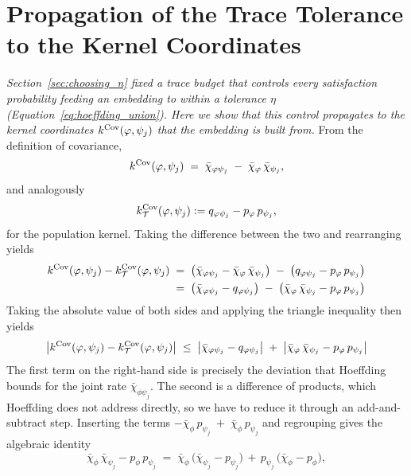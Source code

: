 \documentclass[titlepage,a4paper,11pt]{report}
\begin{document}
\section{Propagation of the Trace Tolerance to the Kernel Coordinates}\label{app:tolerance_derivation}
    \emph{Section~\ref{sec:choosing_n} fixed a trace budget that controls every satisfaction probability feeding an embedding to within a tolerance $\eta$ (Equation~\eqref{eq:hoeffding_union}). Here we show that this control propagates to the kernel coordinates $k^{\mathrm{Cov}}(\varphi,\psi_j)$ that the embedding is built from.} From the definition of covariance,
    \begin{equation}\label{eq:kcov_decomposition}
        k^{\mathrm{Cov}}(\varphi, \psi_j) \;=\;\bar\chi_{\varphi\psi_j} \;-\; \bar\chi_\varphi\, \bar\chi_{\psi_j},
    \end{equation}
    and analogously 
    \begin{equation}
        k^{\mathrm{Cov}}_\mathcal{T}(\varphi, \psi_j) := q_{\varphi\psi_j} - p_\varphi\, p_{\psi_j},
    \end{equation} for the population kernel. Taking the difference between the two and rearranging yields
    \begin{align*}
        k^{\mathrm{Cov}}(\varphi, \psi_j) - k^{\mathrm{Cov}}_\mathcal{T}(\varphi, \psi_j)
        &\;=\; \bigl(\bar\chi_{\varphi\psi_j} - \bar\chi_\varphi\, \bar\chi_{\psi_j}\bigr) \;-\; \bigl(q_{\varphi\psi_j} - p_\varphi\, p_{\psi_j}\bigr) \\
        &\;=\; \bigl(\bar\chi_{\varphi\psi_j} - q_{\varphi\psi_j}\bigr) \;-\; \bigl(\bar\chi_\varphi\, \bar\chi_{\psi_j} - p_\varphi\, p_{\psi_j}\bigr)
    \end{align*}
    Taking the absolute value of both sides and applying the triangle inequality then yields
    \begin{equation}\label{eq:kcov_outer_triangle}
        \bigl|k^{\mathrm{Cov}}(\varphi, \psi_j) - k^{\mathrm{Cov}}_\mathcal{T}(\varphi, \psi_j)\bigr| \;\le\; \bigl|\bar\chi_{\varphi\psi_j} - q_{\varphi\psi_j}\bigr| \;+\; \bigl|\bar\chi_\varphi\, \bar\chi_{\psi_j} - p_\varphi\, p_{\psi_j}\bigr|
    \end{equation}
    The first term on the right-hand side is precisely the deviation that Hoeffding bounds for the joint rate $\bar\chi_{\phi\psi_j}$. The second is a difference of products, which Hoeffding does not address directly, so we have to reduce it through an add-and-subtract step. Inserting the terms $-\bar\chi_\phi \, p_{\psi_j}\;+\; \bar\chi_\phi \, p_{\psi_j}$ and regrouping gives the algebraic identity
    \begin{equation*}
        \bar\chi_\phi\, \bar\chi_{\psi_j} - p_\phi\, p_{\psi_j} \;=\; \bar\chi_\phi\,\bigl(\bar\chi_{\psi_j} - p_{\psi_j}\bigr) \, + \, p_{\psi_j}\,\bigl(\bar\chi_\phi - p_\phi\bigr),
    \end{equation*}
\end{document}
